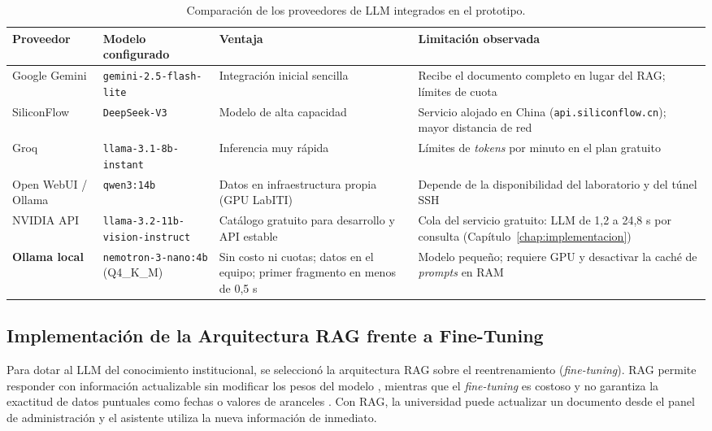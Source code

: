\begin{table}[H]
  \caption{Comparación de los proveedores de LLM integrados en el prototipo.}
  \label{tab:comparativa_llm}
\centering
\small
\setlength{\tabcolsep}{4pt}
\renewcommand{\arraystretch}{1.25}
\begin{tabular}{|>{\raggedright\arraybackslash}p{2.4cm}|>{\raggedright\arraybackslash}p{3.4cm}|>{\raggedright\arraybackslash}p{3.2cm}|>{\raggedright\arraybackslash}p{3.3cm}|}
\hline
\rowcolor[HTML]{EFEFEF}
\textbf{Proveedor} & \textbf{Modelo configurado} & \textbf{Ventaja} & \textbf{Limitación observada} \\ \hline
Google Gemini & \texttt{gemini-\allowbreak{}2.\allowbreak{}5-\allowbreak{}flash-\allowbreak{}lite} & Integración inicial sencilla & Recibe el documento completo en lugar del RAG; límites de cuota \\ \hline
SiliconFlow & \texttt{DeepSeek-V3} & Modelo de alta capacidad & Servicio alojado en China (\texttt{api.\allowbreak{}siliconflow.\allowbreak{}cn}); mayor distancia de red \\ \hline
Groq & \texttt{llama-\allowbreak{}3.\allowbreak{}1-\allowbreak{}8b-\allowbreak{}instant} & Inferencia muy rápida & Límites de \textit{tokens} por minuto en el plan gratuito \\ \hline
Open WebUI / Ollama & \texttt{qwen3:14b} & Datos en infraestructura propia (GPU LabITI) & Depende de la disponibilidad del laboratorio y del túnel SSH \\ \hline
NVIDIA API & \texttt{llama-\allowbreak{}3.\allowbreak{}2-\allowbreak{}11b-\allowbreak{}vision-\allowbreak{}instruct} & Catálogo gratuito para desarrollo y API estable & Cola del servicio gratuito: LLM de 1,2 a 24,8 s por consulta (Capítulo~\ref{chap:implementacion}) \cite{nvidianim2025} \\ \hline
\textbf{Ollama local} & \texttt{nemotron-\allowbreak{}3-\allowbreak{}nano:4b} (Q4\_K\_M) & Sin costo ni cuotas; datos en el equipo; primer fragmento en menos de 0,5 s & Modelo pequeño; requiere GPU y desactivar la caché de \textit{prompts} en RAM \\ \hline
\end{tabular}
\elaboradopor{\autorTFG}
\end{table}

\subsection{Implementación de la Arquitectura RAG frente a Fine-Tuning}
Para dotar al LLM del conocimiento institucional, se seleccionó la arquitectura RAG sobre el reentrenamiento (\textit{fine-tuning}). RAG permite responder con información actualizable sin modificar los pesos del modelo \cite{lewis2020rag}, mientras que el \textit{fine-tuning} es costoso y no garantiza la exactitud de datos puntuales como fechas o valores de aranceles \cite{pabon2025naia}. Con RAG, la universidad puede actualizar un documento desde el panel de administración y el asistente utiliza la nueva información de inmediato.

